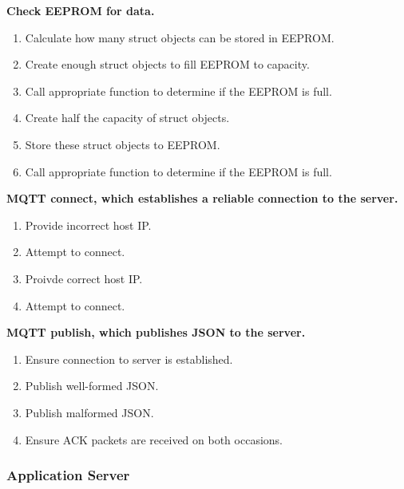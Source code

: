 \documentclass[a4paper,10pt]{article}
\begin{document}
		\textbf{Check EEPROM for data.}
			\begin{enumerate}
				\item Calculate how many struct objects can be stored in EEPROM.
				\item Create enough struct objects to fill EEPROM to capacity.
				\item Call appropriate function to determine if the EEPROM is full.
				\item Create half the capacity of struct objects.
				\item Store these struct objects to EEPROM.
				\item Call appropriate function to determine if the EEPROM is full.
			\end{enumerate}
		\textbf{MQTT connect, which establishes a reliable connection to the server.}
			\begin{enumerate}
				\item Provide incorrect host IP.
				\item Attempt to connect.
				\item Proivde correct host IP.
				\item Attempt to connect.
			\end{enumerate}
		\textbf{MQTT publish, which publishes JSON to the server.}
			\begin{enumerate}
				\item Ensure connection to server is established.
				\item Publish well-formed JSON.
				\item Publish malformed JSON.
				\item Ensure ACK packets are received on both occasions.
			\end{enumerate}
			
		\subsubsection{Application Server}
		
\end{document}
